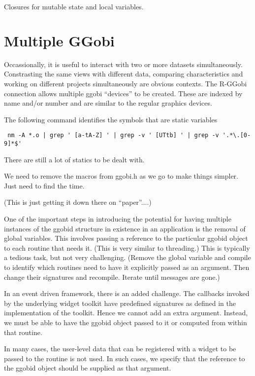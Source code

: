 \documentclass{article}
\begin{document}
Closures for mutable state and local variables.



\section{Multiple GGobi}
Occassionally, it is useful to interact with two or more datasets
simultaneously. Constrasting the same views with different data,
comparing characteristics and working on different projects
simultaneously are obvious contexts. The R-GGobi connection allows
multiple ggobi ``devices'' to be created.  These are indexed by name
and/or number and are similar to the regular graphics devices.


The following command identifies
the symbols that are static variables
\begin{verbatim}
 nm -A *.o | grep ' [a-tA-Z] ' | grep -v ' [UTtb] ' | grep -v '.*\.[0-9]*$'
\end{verbatim}

There are still a lot of statics to be dealt with.

We need to remove the macros from ggobi.h as we go to
make things simpler. Just need to find the time.

(This is just getting it down there on ``paper''....)



One of the important steps in introducing the potential for having
multiple instances of the ggobid structure in existence in an
application is the removal of global variables.  This involves passing
a reference to the particular ggobid object to each routine that needs
it. (This is very similar to threading.)  This is typically a tedious
task, but not very challenging.  (Remove the global variable and
compile to identify which routines need to have it explicitly passed
as an argument.  Then change their signatures and recompile.  Iterate
until messages are gone.)

In an event driven framework, there is an added challenge.  The
callbacks invoked by the underlying widget toolkit have predefined
signatures as defined in the implementation of the toolkit.  Hence we
cannot add an extra argument.  Instead, we must be able to have the
ggobid object passed to it or computed from within that routine.

In many cases, the user-level data that can be registered with a
widget to be passed to the routine is not used.  In such cases, we
specify that the reference to the ggobid object should be supplied as
that argument.
\end{document}
